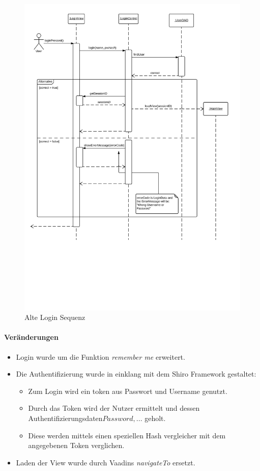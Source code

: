     \begin{figure}
      \centering
        \includegraphics[width=\linewidth]{Login-Sequenz.svg}
       \caption{Alte Login Sequenz}
    \end{figure}

    \paragraph{Veränderungen}
        \begin{itemize}
            \item Login wurde um die Funktion \emph{remember me} erweitert.
            \item Die Authentifizierung wurde in einklang mit dem Shiro Framework gestaltet:
            \begin{itemize}
                \item Zum Login wird ein token aus Passwort und Username genutzt.
                \item Durch das Token wird der Nutzer ermittelt und dessen Authentifizierungsdaten\(Password, ...\) geholt.
                \item Diese werden mittels einen speziellen Hash vergleicher mit dem angegebenen Token verglichen.
            \end{itemize}
            \item Laden der View wurde durch Vaadins \emph{navigateTo} ersetzt.
        \end{itemize}

